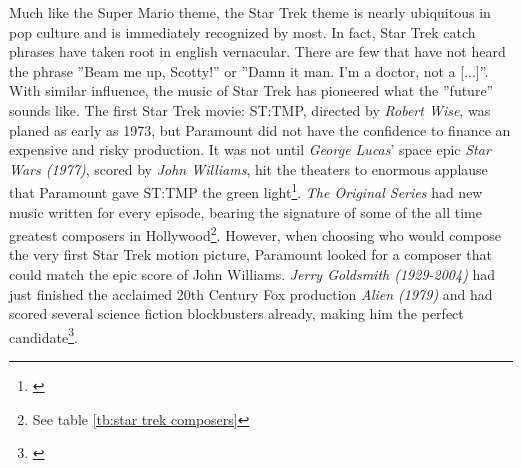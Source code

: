 Much like the Super Mario theme, the Star Trek theme is nearly ubiquitous in pop culture and is immediately recognized by most. In fact, Star Trek catch phrases have taken root in english vernacular. There are few that have not heard the phrase ''Beam me up, Scotty!'' or ''Damn it man. I'm a doctor, not a [...]''. With similar influence, the music of Star Trek has pioneered what the ''future'' sounds like. The first Star Trek movie: \ac{ST:TMP}, directed by \textit{Robert Wise}, was planed as early as 1973, but Paramount did not have the confidence to finance an expensive and risky production. It was not until \textit{George Lucas}' space epic \textit{Star Wars (1977)}, scored by \textit{John Williams}, hit the theaters to enormous applause that Paramount gave \ac{ST:TMP} the green light\footnote{\citealt{bond_music_1998}}. \textit{The Original Series} had new music written for every episode, bearing the signature of some of the all time greatest composers in Hollywood\footnote{See table \ref{tb:star trek composers}}. However, when choosing who would compose the very first Star Trek motion picture, Paramount looked for a composer that could match the epic score of John Williams. \textit{Jerry Goldsmith (1929-2004)} had just finished the acclaimed 20th Century Fox production \textit{Alien (1979)} and had scored several science fiction blockbusters already, making him the perfect candidate\footnote{\citealt[p. 87]{bond_music_1998}}. 

